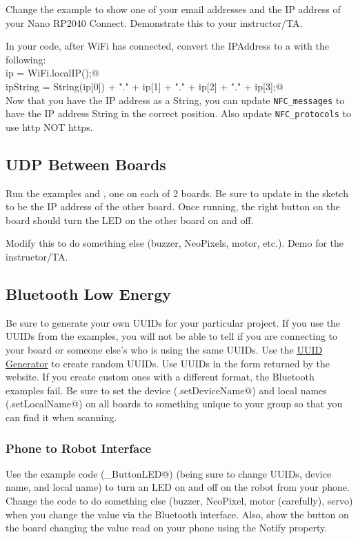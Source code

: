 Change the example to show one of your email addresses and the IP address of your 
Nano RP2040 Connect. Demonstrate this to your instructor/TA.

In your code, after WiFi has connected, convert the IPAddress to a \lstinline@String@ 
with the following:\\
\lstinline@IPAddress ip = WiFi.localIP();@\\
\lstinline@String ipString = String(ip[0]) + "." + ip[1] + "." + ip[2] + "." + ip[3];@\\
Now that you have the IP address as a String, you can update \lstinline|NFC_messages| to 
have the IP address String in the correct position. Also update \lstinline|NFC_protocols| 
to use http NOT https.


\subsection{UDP Between Boards}
Run the examples \lstinline@WiFiUdpSend@ and \lstinline@WiFiUdpReceiveSend@, one 
on each of 2 boards. Be sure to update \lstinline@remoteIp@ in the 
\lstinline@WiFiUdpSend@ sketch to be the IP address of the other board. Once 
running, the right button on the \lstinline@@ board should turn the LED on 
the other board on and off.

Modify this to do something else (buzzer, NeoPixels, motor, etc.). Demo for the 
instructor/TA.

\subsection{Bluetooth Low Energy}
Be sure to generate your own UUIDs for your particular project. If you use
the UUIDs from the examples, you will not be able to tell if you are connecting
to your board or someone else's who is using the same UUIDs. Use the 
\href{https://www.uuidgenerator.net/}{UUID Generator} to create random UUIDs.
Use UUIDs in the form returned by the website. If you create custom ones with 
a different format, the Bluetooth examples fail.
Be sure to set the device (\lstinline@BLE.setDeviceName@) and local names 
(\lstinline@BLE.setLocalName@) on all boards to something unique to 
your group so that you can find it when scanning.

\subsubsection{Phone to Robot Interface}
Use the example code (\lstinline@BLE_ButtonLED@) (being sure to change UUIDs, device name, and local name)
to turn an LED on and off on the robot from your phone. Change the code to 
do something else (buzzer, NeoPixel, motor (carefully), servo) when you change 
the value via the Bluetooth interface. Also, show the button on the board changing
the value read on your phone using the Notify property.


